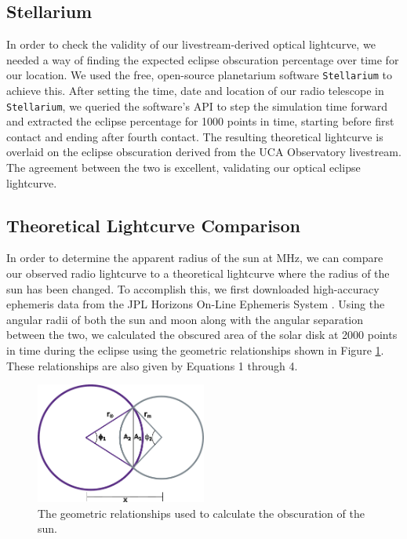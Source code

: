 \subsection{\label{sec:stellarium}Stellarium}

In order to check the validity of our livestream-derived optical lightcurve, we needed a way of finding the expected eclipse obscuration percentage over time for our location.
We used the free, open-source planetarium software \texttt{Stellarium} to achieve this.
After setting the time, date and location of our radio telescope in \texttt{Stellarium}, we queried the software's API to step the simulation time forward and extracted the eclipse percentage for 1000 points in time, starting before first contact and ending after fourth contact.
The resulting theoretical lightcurve is overlaid on the eclipse obscuration derived from the UCA Observatory livestream.
The agreement between the two is excellent, validating our optical eclipse lightcurve.

\subsection{\label{sec:theoreticalLightcurves}Theoretical Lightcurve Comparison}

In order to determine the apparent radius of the sun at \unit[1420]{MHz}, we can compare our observed radio lightcurve to a theoretical lightcurve where the radius of the sun has been changed.
To accomplish this, we first downloaded high-accuracy ephemeris data from the JPL Horizons On-Line Ephemeris System \cite{nasa_jpl_solar_system_dynamics_group_jpl_nodate}. 
Using the angular radii of both the sun and moon along with the angular separation between the two, we calculated the obscured area of the solar disk at 2000 points in time during the eclipse using the geometric relationships shown in Figure \ref{fig:eclipse_geometry}.
These relationships are also given by Equations 1 through 4.

\begin{figure}
  \includegraphics[width=0.5\textwidth]{figures/drawing}
  \caption{\label{fig:eclipse_geometry} The geometric relationships used to calculate the obscuration of the sun.}
\end{figure}

